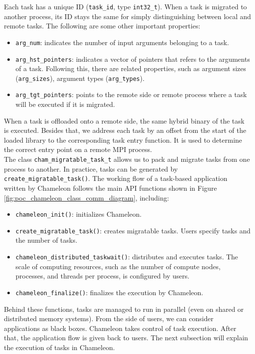 Each task has a unique ID (\texttt{task\_id}, type \texttt{int32\_t}). When a task is migrated to another process, its ID stays the same for simply distinguishing between local and remote tasks. The following are some other important properties:
\begin{itemize}
	\item \texttt{arg\_num}: indicates the number of input arguments belonging to a task.
	\item \texttt{arg\_hst\_pointers}: indicates a vector of pointers that refers to the arguments of a task. Following this, there are related properties, such as argument sizes (\texttt{arg\_sizes}), argument types (\texttt{arg\_types}).
	\item \texttt{arg\_tgt\_pointers}: points to the remote side or remote process where a task will be executed if it is migrated.
\end{itemize}

When a task is offloaded onto a remote side, the same hybrid binary of the task is executed. Besides that, we address each task by an offset from the start of the loaded library to the corresponding task entry function. It is used to determine the correct entry point on a remote MPI process.\\

The class \texttt{cham\_migratable\_task\_t} allows us to pack and migrate tasks from one process to another. In practice, tasks can be generated by \texttt{create\_migratable\_task()}. The working flow of a task-based application written by Chameleon follows the main API functions shown in Figure \ref{fig:poc_chameleon_class_comm_diagram}, including:
\begin{itemize}
	\item \texttt{chameleon\_init()}: initializes Chameleon.
	\item \texttt{create\_migratable\_task()}: creates migratable tasks. Users specify tasks and the number of tasks.
	\item \texttt{chameleon\_distributed\_taskwait()}: distributes and executes tasks. The scale of computing resources, such as the number of compute nodes, processes, and threads per process, is configured by users.
	\item \texttt{chameleon\_finalize()}: finalizes the execution by Chameleon.
\end{itemize}

Behind these functions, tasks are managed to run in parallel (even on shared or distributed memory systems). From the side of users, we can consider applications as black boxes. Chameleon takes control of task execution. After that, the application flow is given back to users. The next subsection will explain the execution of tasks in Chameleon.

